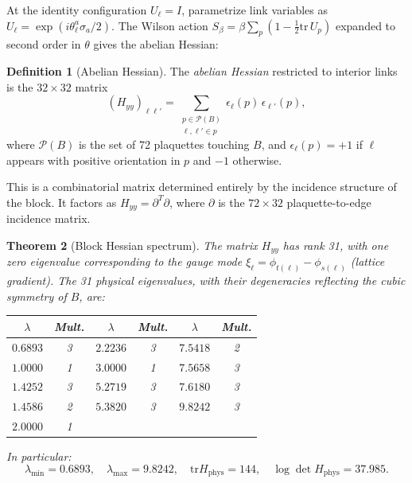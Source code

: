 \documentclass[11pt]{article}
\newtheorem{theorem}{Theorem}[section]
\theoremstyle{definition}
\newtheorem{definition}[theorem]{Definition}
\newcommand{\tr}{\mathrm{tr}}
\begin{document}
At the identity configuration $U_\ell=I$, parametrize link variables as
$U_\ell=\exp(i\theta_\ell^a\sigma_a/2)$.  The Wilson action
$S_\beta=\beta\sum_p(1-\frac{1}{2}\tr\,U_p)$ expanded to second order
in $\theta$ gives the abelian Hessian:

\begin{definition}[Abelian Hessian]\label{def:Hyy}
The \emph{abelian Hessian} restricted to interior links is the
$32\times 32$ matrix
\begin{equation}\label{eq:Hyy}
(H_{yy})_{\ell\ell'}
=\sum_{\substack{p\in\mathcal{P}(B)\\\ell,\ell'\in p}}
\epsilon_\ell(p)\,\epsilon_{\ell'}(p),
\end{equation}
where $\mathcal{P}(B)$ is the set of 72 plaquettes touching $B$, and
$\epsilon_\ell(p)=+1$ if $\ell$ appears with positive orientation in
$p$ and $-1$ otherwise.
\end{definition}

This is a combinatorial matrix determined entirely by the incidence
structure of the block.  It factors as $H_{yy}=\partial^T\partial$,
where $\partial$ is the $72\times 32$ plaquette-to-edge incidence
matrix.

\begin{theorem}[Block Hessian spectrum]\label{thm:spectrum}
The matrix $H_{yy}$ has rank 31, with one zero eigenvalue corresponding
to the gauge mode $\xi_\ell=\phi_{t(\ell)}-\phi_{s(\ell)}$ (lattice
gradient).  The 31 physical eigenvalues, with their degeneracies
reflecting the cubic symmetry of $B$, are:

\begin{center}
\begin{tabular}{cccccc}
\toprule
$\lambda$ & Mult. & $\lambda$ & Mult. & $\lambda$ & Mult.\\
\midrule
$0.6893$ & 3 & $2.2236$ & 3 & $7.5418$ & 2\\
$1.0000$ & 1 & $3.0000$ & 1 & $7.5658$ & 3\\
$1.4252$ & 3 & $5.2719$ & 3 & $7.6180$ & 3\\
$1.4586$ & 2 & $5.3820$ & 3 & $9.8242$ & 3\\
$2.0000$ & 1 & & & &\\
\bottomrule
\end{tabular}
\end{center}

\noindent In particular:
\begin{equation}\label{eq:spectraldata}
\lambda_{\min}=0.6893,\quad
\lambda_{\max}=9.8242,\quad
\tr H_{\mathrm{phys}}=144,\quad
\log\det H_{\mathrm{phys}}=37.985.
\end{equation}
\end{theorem}
\end{document}
